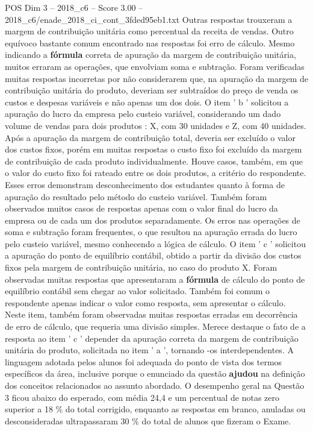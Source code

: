 \begin{textsample}{POS Dim 3 – 2018\_c6 – Score 3.00 – 2018\_c6/enade\_2018\_ci\_cont\_3fded95eb1.txt}
Outras respostas trouxeram a margem de contribuição unitária como percentual da receita de vendas.
Outro equívoco bastante comum encontrado nas respostas foi erro de cálculo.
Mesmo indicando a \textbf{fórmula} correta de apuração da margem de contribuição unitária, muitos erraram as operações, que envolviam soma e subtração.
Foram verificadas muitas respostas incorretas por não considerarem que, na apuração da margem de contribuição unitária do produto, deveriam ser subtraídos do preço de venda os custos e despesas variáveis e não apenas um dos dois.
O item ' b ' solicitou a apuração do lucro da empresa pelo custeio variável, considerando um dado volume de vendas para dois produtos : X, com 30 unidades e Z, com 40 unidades.
Após a apuração da margem de contribuição total, deveria ser excluído o valor dos custos fixos, porém em muitas respostas o custo fixo foi excluído da margem de contribuição de cada produto individualmente.
Houve casos, também, em que o valor do custo fixo foi rateado entre os dois produtos, a critério do respondente.
Esses erros demonstram desconhecimento dos estudantes quanto à forma de apuração do resultado pelo método do custeio variável.
Também foram observados muitos casos de respostas apenas com o valor final do lucro da empresa ou de cada um dos produtos separadamente.
Os erros nas operações de soma e subtração foram frequentes, o que resultou na apuração errada do lucro pelo custeio variável, mesmo conhecendo a lógica de cálculo.
O item ' c ' solicitou a apuração do ponto de equilíbrio contábil, obtido a partir da divisão dos custos fixos pela margem de contribuição unitária, no caso do produto X.
Foram observadas muitas respostas que apresentaram a \textbf{fórmula} de cálculo do ponto de equilíbrio contábil sem chegar ao valor solicitado.
Também foi comum o respondente apenas indicar o valor como resposta, sem apresentar o cálculo.
Neste item, também foram observadas muitas respostas erradas em decorrência de erro de cálculo, que requeria uma divisão simples.
Merece destaque o fato de a resposta ao item ’ c ’ depender da apuração correta da margem de contribuição unitária do produto, solicitada no item ' a ', tornando -os interdependentes.
A linguagem adotada pelos alunos foi adequada do ponto de vista dos termos específicos da área, inclusive porque o enunciado da questão \textbf{ajudou} na definição dos conceitos relacionados ao assunto abordado.
O desempenho geral na Questão 3 ficou abaixo do esperado, com média 24,4 e um percentual de notas zero superior a 18 \% do total corrigido, enquanto as respostas em branco, anuladas ou desconsideradas ultrapassaram 30 \% do total de alunos que fizeram o Exame.

\end{textsample}
